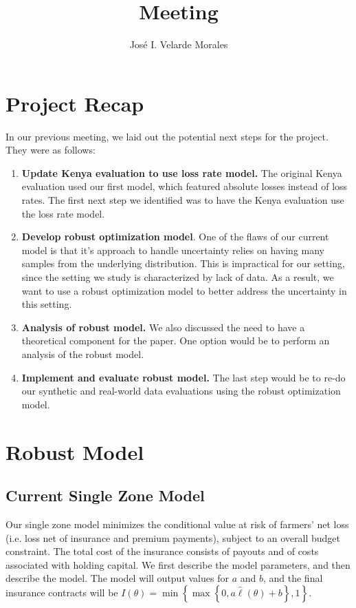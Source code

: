 \documentclass[11pt]{article}
\title{Meeting}
\author{José I. Velarde Morales}
\begin{document}
\maketitle
\section{Project Recap}
In our previous meeting, we laid out the potential next steps for the project. They were as follows: 
\begin{enumerate}
    \item \textbf{Update Kenya evaluation to use loss rate model.} The original Kenya evaluation used our first model, which featured absolute losses instead of loss rates. The first next step we identified was to have the Kenya evaluation use the loss rate model. 
    \item \textbf{Develop robust optimization model}. One of the flaws of our current model is that it's approach to handle uncertainty relies on having many samples from the underlying distribution. This is impractical for our setting, since the setting we study is characterized by lack of data. As a result, we want to use a robust optimization model to better address the uncertainty in this setting. 
    \item \textbf{Analysis of robust model.} We also discussed the need to have a theoretical component for the paper. One option would be to perform an analysis of the robust model. 
    \item \textbf{Implement and evaluate robust model.} The last step would be to re-do our synthetic and real-world data evaluations using the robust optimization model. 
\end{enumerate}

\section{Robust Model}
\subsection{Current Single Zone Model}
  Our single zone model minimizes the conditional value at risk of farmers' net loss (i.e. loss net of insurance and premium payments), subject to an overall budget constraint. The total cost of the insurance consists of payouts and of costs associated with holding capital. We first describe the model parameters, and then describe the model. The model will output values for $a$ and $b$, and the final insurance contracts will be $I(\theta) = \min \left \{\max \left \{0,a\hat{\ell}(\theta) + b \right \}, 1 \right \}$.
\end{document}
